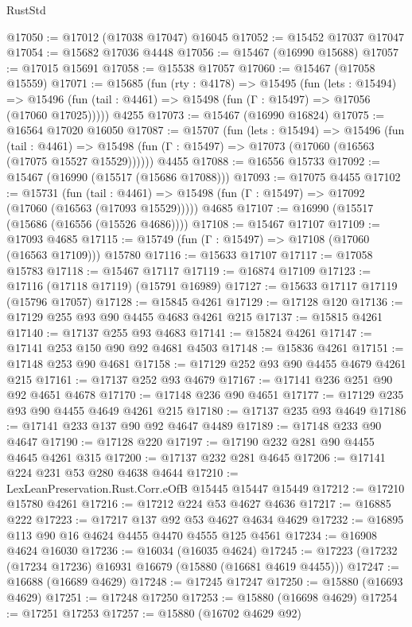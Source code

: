\begin{lexlean}{RustStd}
\begin{coremodule}
@17050 := @17012 (@17038 @17047) @16045
@17052 := @15452 @17037 @17047
@17054 := @15682 @17036 @4448
@17056 := @15467 (@16990 @15688)
@17057 := @17015 @15691
@17058 := @15538 @17057
@17060 := @15467 (@17058 @15559)
@17071 := @15685
    (fun (rty : @4178) =>
    @15495
      (fun (lets : @15494) =>
      @15496 (fun (tail : @4461) => @15498 (fun (Γ : @15497) => @17056 (@17060 @17025)))))
    @4255
@17073 := @15467 (@16990 @16824)
@17075 := @16564 @17020 @16050
@17087 := @15707
    (fun (lets : @15494) =>
    @15496
      (fun (tail : @4461) =>
      @15498 (fun (Γ : @15497) => @17073 (@17060 (@16563 (@17075 @15527 @15529))))))
    @4455
@17088 := @16556 @15733
@17092 := @15467 (@16990 (@15517 (@15686 @17088)))
@17093 := @17075 @4455
@17102 := @15731
    (fun (tail : @4461) => @15498 (fun (Γ : @15497) => @17092 (@17060 (@16563 (@17093 @15529)))))
    @4685
@17107 := @16990 (@15517 (@15686 (@16556 (@15526 @4686))))
@17108 := @15467 @17107
@17109 := @17093 @4685
@17115 := @15749 (fun (Γ : @15497) => @17108 (@17060 (@16563 @17109))) @15780
@17116 := @15633 @17107
@17117 := @17058 @15783
@17118 := @15467 @17117
@17119 := @16874 @17109
@17123 := @17116 (@17118 @17119) (@15791 @16989)
@17127 := @15633 @17117 @17119 (@15796 @17057)
@17128 := @15845 @4261
@17129 := @17128 @120
@17136 := @17129 @255 @93 @90 @4455 @4683 @4261 @215
@17137 := @15815 @4261
@17140 := @17137 @255 @93 @4683
@17141 := @15824 @4261
@17147 := @17141 @253 @150 @90 @92 @4681 @4503
@17148 := @15836 @4261
@17151 := @17148 @253 @90 @4681
@17158 := @17129 @252 @93 @90 @4455 @4679 @4261 @215
@17161 := @17137 @252 @93 @4679
@17167 := @17141 @236 @251 @90 @92 @4651 @4678
@17170 := @17148 @236 @90 @4651
@17177 := @17129 @235 @93 @90 @4455 @4649 @4261 @215
@17180 := @17137 @235 @93 @4649
@17186 := @17141 @233 @137 @90 @92 @4647 @4489
@17189 := @17148 @233 @90 @4647
@17190 := @17128 @220
@17197 := @17190 @232 @281 @90 @4455 @4645 @4261 @315
@17200 := @17137 @232 @281 @4645
@17206 := @17141 @224 @231 @53 @280 @4638 @4644
@17210 := LexLeanPreservation.Rust.Corr.eOfB @15445 @15447 @15449
@17212 := @17210 @15780 @4261
@17216 := @17212 @224 @53 @4627 @4636
@17217 := @16885 @222
@17223 := @17217 @137 @92 @53 @4627 @4634 @4629
@17232 := @16895 @113 @90 @16 @4624 @4455 @4470 @4555 @125 @4561
@17234 := @16908 @4624 @16030
@17236 := @16034 (@16035 @4624)
@17245 := @17223 (@17232 (@17234 @17236) @16931 @16679 (@15880 (@16681 @4619 @4455)))
@17247 := @16688 (@16689 @4629)
@17248 := @17245 @17247
@17250 := @15880 (@16693 @4629)
@17251 := @17248 @17250
@17253 := @15880 (@16698 @4629)
@17254 := @17251 @17253
@17257 := @15880 (@16702 @4629 @92)

\end{coremodule}
\end{lexlean}
